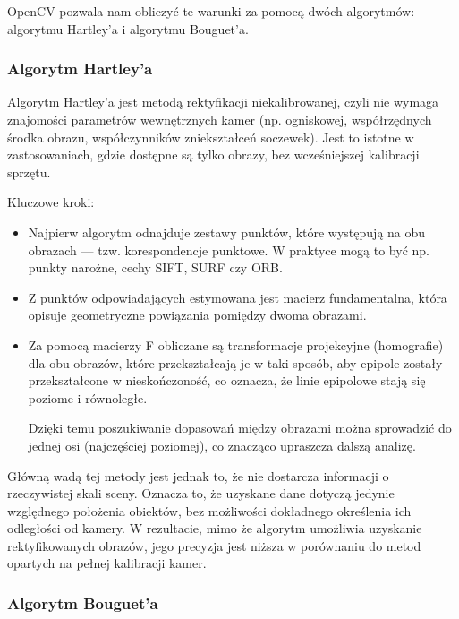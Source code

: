 \documentclass[magisterska]{pracadypl}
\begin{document}
OpenCV pozwala nam obliczyć te warunki za pomocą dwóch algorytmów: algorytmu Hartley'a
i algorytmu Bouguet'a.

\subsubsection{Algorytm Hartley'a}

Algorytm Hartley’a \cite{hartley} jest metodą rektyfikacji niekalibrowanej, czyli nie wymaga znajomości parametrów wewnętrznych kamer (np. ogniskowej, współrzędnych środka obrazu, współczynników zniekształceń soczewek). Jest to istotne w zastosowaniach, gdzie dostępne są tylko obrazy, bez wcześniejszej kalibracji sprzętu.

\bigskip

Kluczowe kroki:

\begin{itemize}
\item Najpierw algorytm odnajduje zestawy punktów, które występują na obu obrazach — tzw. korespondencje punktowe. W praktyce mogą to być np. punkty narożne, cechy SIFT, SURF czy ORB.

\item Z punktów odpowiadających estymowana jest macierz fundamentalna, która opisuje geometryczne powiązania pomiędzy dwoma obrazami.

\item Za pomocą macierzy F obliczane są transformacje projekcyjne (homografie) dla obu obrazów, które przekształcają je w taki sposób, aby epipole zostały przekształcone w nieskończoność, co oznacza, że linie epipolowe stają się poziome i równoległe.

Dzięki temu poszukiwanie dopasowań między obrazami można sprowadzić do jednej osi (najczęściej poziomej), co znacząco upraszcza dalszą analizę.
\end{itemize}

Główną wadą tej metody jest jednak to, że nie dostarcza informacji o rzeczywistej skali sceny. Oznacza to, że uzyskane dane dotyczą jedynie względnego położenia obiektów, bez możliwości dokładnego określenia ich odległości od kamery. W rezultacie, mimo że algorytm umożliwia uzyskanie rektyfikowanych obrazów, jego precyzja jest niższa w porównaniu do metod opartych na pełnej kalibracji kamer.

\subsubsection{Algorytm Bouguet'a}
\end{document}
